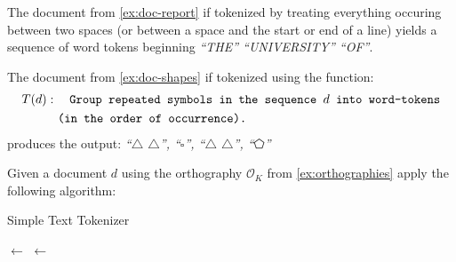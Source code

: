 \begin{example}\label{ex:doc-report-t}
  The document from \autoref{ex:doc-report} if tokenized by treating everything occuring between two spaces (or between a space and the start or end of a line) yields a sequence of word tokens beginning \emph{``THE'' ``UNIVERSITY'' ``OF''}.
\end{example}
\vspace{6pt}

\begin{example}\label{ex:doc-shapes-t}
  The document from \autoref{ex:doc-shapes} if tokenized using the function:
  \begin{align*}
    &T(d):\quad \texttt{Group repeated symbols in the sequence $d$ into word-tokens}\\
    &\hphantom{T(d):\ }\texttt{(in the order of occurrence).}
  \end{align*}
  produces the output: \emph{``$\triangle$ $\triangle$'', ``$\square$'', ``$\triangle$ $\triangle$'', ``$\pentagon$''}
\end{example}
\vspace{6pt}

\begin{example}\label{ex:t-simple}
  Given a document $d$ using the orthography $\mathscr{O}_K$ from \autoref{ex:orthographies} apply the following algorithm:
  \begin{algorithm}
    \caption{Simple Text Tokenizer}

    \BlankLine

    \Tokens $\leftarrow$ \List{}\;
    \NextToken $\leftarrow$ \List{}\;
  \end{algorithm}
\end{example}

